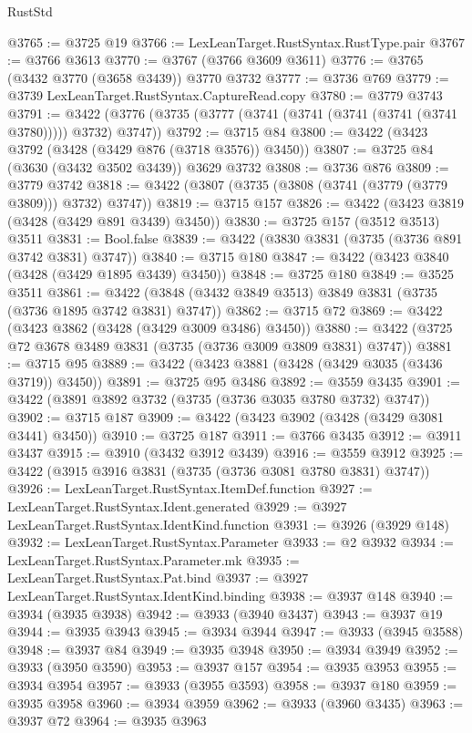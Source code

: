 \begin{lexlean}{RustStd}
\begin{coremodule}
@3765 := @3725 @19
@3766 := LexLeanTarget.RustSyntax.RustType.pair
@3767 := @3766 @3613
@3770 := @3767 (@3766 @3609 @3611)
@3776 := @3765 (@3432 @3770 (@3658 @3439)) @3770 @3732
@3777 := @3736 @769
@3779 := @3739 LexLeanTarget.RustSyntax.CaptureRead.copy
@3780 := @3779 @3743
@3791 := @3422 (@3776 (@3735 (@3777 (@3741 (@3741 (@3741 (@3741 (@3741 @3780))))) @3732) @3747))
@3792 := @3715 @84
@3800 := @3422 (@3423 @3792 (@3428 (@3429 @876 (@3718 @3576)) @3450))
@3807 := @3725 @84 (@3630 (@3432 @3502 @3439)) @3629 @3732
@3808 := @3736 @876
@3809 := @3779 @3742
@3818 := @3422 (@3807 (@3735 (@3808 (@3741 (@3779 (@3779 @3809))) @3732) @3747))
@3819 := @3715 @157
@3826 := @3422 (@3423 @3819 (@3428 (@3429 @891 @3439) @3450))
@3830 := @3725 @157 (@3512 @3513) @3511
@3831 := Bool.false
@3839 := @3422 (@3830 @3831 (@3735 (@3736 @891 @3742 @3831) @3747))
@3840 := @3715 @180
@3847 := @3422 (@3423 @3840 (@3428 (@3429 @1895 @3439) @3450))
@3848 := @3725 @180
@3849 := @3525 @3511
@3861 := @3422 (@3848 (@3432 @3849 @3513) @3849 @3831 (@3735 (@3736 @1895 @3742 @3831) @3747))
@3862 := @3715 @72
@3869 := @3422 (@3423 @3862 (@3428 (@3429 @3009 @3486) @3450))
@3880 := @3422 (@3725 @72 @3678 @3489 @3831 (@3735 (@3736 @3009 @3809 @3831) @3747))
@3881 := @3715 @95
@3889 := @3422 (@3423 @3881 (@3428 (@3429 @3035 (@3436 @3719)) @3450))
@3891 := @3725 @95 @3486
@3892 := @3559 @3435
@3901 := @3422 (@3891 @3892 @3732 (@3735 (@3736 @3035 @3780 @3732) @3747))
@3902 := @3715 @187
@3909 := @3422 (@3423 @3902 (@3428 (@3429 @3081 @3441) @3450))
@3910 := @3725 @187
@3911 := @3766 @3435
@3912 := @3911 @3437
@3915 := @3910 (@3432 @3912 @3439)
@3916 := @3559 @3912
@3925 := @3422 (@3915 @3916 @3831 (@3735 (@3736 @3081 @3780 @3831) @3747))
@3926 := LexLeanTarget.RustSyntax.ItemDef.function
@3927 := LexLeanTarget.RustSyntax.Ident.generated
@3929 := @3927 LexLeanTarget.RustSyntax.IdentKind.function
@3931 := @3926 (@3929 @148)
@3932 := LexLeanTarget.RustSyntax.Parameter
@3933 := @2 @3932
@3934 := LexLeanTarget.RustSyntax.Parameter.mk
@3935 := LexLeanTarget.RustSyntax.Pat.bind
@3937 := @3927 LexLeanTarget.RustSyntax.IdentKind.binding
@3938 := @3937 @148
@3940 := @3934 (@3935 @3938)
@3942 := @3933 (@3940 @3437)
@3943 := @3937 @19
@3944 := @3935 @3943
@3945 := @3934 @3944
@3947 := @3933 (@3945 @3588)
@3948 := @3937 @84
@3949 := @3935 @3948
@3950 := @3934 @3949
@3952 := @3933 (@3950 @3590)
@3953 := @3937 @157
@3954 := @3935 @3953
@3955 := @3934 @3954
@3957 := @3933 (@3955 @3593)
@3958 := @3937 @180
@3959 := @3935 @3958
@3960 := @3934 @3959
@3962 := @3933 (@3960 @3435)
@3963 := @3937 @72
@3964 := @3935 @3963

\end{coremodule}
\end{lexlean}

